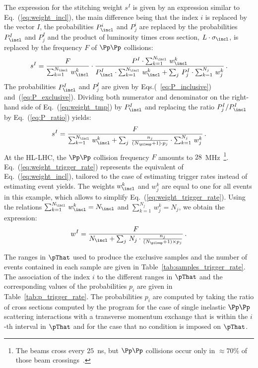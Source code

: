 The expression for the stitching weight $s^{I}$ is given by an expression similar to Eq.~(\ref{eq:weight_incl}),
the main difference being that the index $i$ is replaced by the vector $I$,
the probabilities $P_{\incl}^{i}$ and $P_{j}^{i}$ are replaced by the probabilities $P_{\incl}^{I}$ and $P_{j}^{I}$
and the product of luminosity times cross section, $L \cdot \sigma_{\incl}$, is replaced by the frequency $F$ of $\Pp\Pp$ collisions:
\begin{equation}
s^{I} = \frac{F}{\sum_{k=1}^{N_{\incl}} \, w_{\incl}^{k}} \cdot \frac{P^{I} \cdot \sum_{k=1}^{N_{\incl}} \, w_{\incl}^{k}}{P_{\incl}^{I} \cdot \sum_{k=1}^{N_{\incl}} \, w_{\incl}^{k} + \sum_{j} \, P_{j}^{I} \cdot \sum_{k=1}^{N_{j}} \, w_{j}^{k}} \, .
\label{eq:weight_tmp}
\end{equation}
The probabilities $P_{\incl}^{I}$ and $P_{j}^{I}$ are given by Eqs.(~\ref{eq:P_inclusive}) and~(\ref{eq:P_exclusive}).
Dividing both numerator and denominator on the right-hand side of Eq.~(\ref{eq:weight_tmp}) by $P_{\incl}^{I}$ and replacing the ratio $P_{j}^{I}/P_{\incl}^{I}$ by Eq.~(\ref{eq:P_ratio}) yields:
\begin{equation}
s^{I} = \frac{F}{\sum_{k=1}^{N_{\incl}} \, w_{\incl}^{k} + \sum_{j} \, \frac{n_{j}}{(N_{\pileup} + 1) \cdot p_{j}} \cdot \sum_{k=1}^{N_{j}} \, w_{j}^{k}} \, .
\label{eq:weight_trigger_rate}
\end{equation}
At the HL-LHC, the $\Pp\Pp$ collision frequency $F$ amounts to $28$~MHz~\footnote{
  The beams cross every $25$~ns, but $\Pp\Pp$ collisions occur only in $\approx 70\%$ of those beam crossings~\cite{TDR_Phase2_LHC}.}.
Eq.~(\ref{eq:weight_trigger_rate}) represents the equivalent of Eq.~(\ref{eq:weight_incl}),
tailored to the case of estimating trigger rates instead of estimating event yields.
The weights $w_{\incl}^{k}$ and $w_{j}^{k}$ are equal to one for all events in this example,
which allows to simplify Eq.~(\ref{eq:weight_trigger_rate}).
Using the relations $\sum_{k=1}^{N_{\incl}} \, w_{\incl}^{k} = N_{\incl}$ and $\sum_{k=1}^{N_{j}} \, w_{j}^{k} = N_{j}$,
we obtain the expression:
\begin{equation}
w^{I} = \frac{F}{N_{\incl} + \sum_{j} \, N_{j} \cdot \frac{n_{j}}{(N_{\pileup} + 1) \times p_{j}}} \, .
\label{eq:weight_trigger_rate_simplified}
\end{equation}

The ranges in $\pThat$ used to produce the exclusive samples and the number of events contained in each sample
are given in Table~\ref{tab:samples_trigger_rate}.
The association of the index $i$ to the different ranges in $\pThat$ and the 
corresponding values of the probabilities $p_{i}$ are given in Table~\ref{tab:p_trigger_rate}.
The probabilities $p_{i}$ are computed by taking the ratio of cross sections computed by the program \PYTHIA
for the case of single inelastic $\Pp\Pp$ scattering interactions with a transverse momentum exchange that is within the $i$-th interval in $\pThat$
and for the case that no condition is imposed on $\pThat$.

